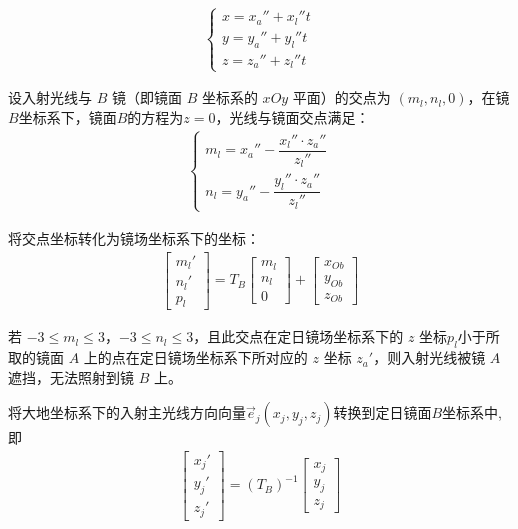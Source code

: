\documentclass[../main.tex]{subfiles}
\begin{document}
\begin{align} \label{1.34}
 \begin{cases}
x = x_a'' + x_l'' t \\
y = y_a'' + y_l'' t \\
z = z_a'' + z_l'' t
\end{cases}
\end{align}
\par 设入射光线与 $B$ 镜（即镜面 $B$ 坐标系的 $xOy$ 平面）的交点为 $(m_l, n_l, 0)$，在镜\( B \)坐标系下，镜面\( B \)的方程为\( z = 0 \)，光线与镜面交点满足：
\begin{align}\label{4.1}
  \begin{cases}
m_l = x_a'' - \dfrac{x_l'' \cdot z_a''}{z_l''} \\
n_l = y_a'' - \dfrac{y_l'' \cdot z_a''}{z_l''}
\end{cases}
\end{align}
\par 将交点坐标转化为镜场坐标系下的坐标：
\begin{align}\label{4.2}
\begin{bmatrix}
m_l' \\
n_l' \\
p_l
\end{bmatrix}
= T_B \begin{bmatrix}
m_l \\
n_l \\
0
\end{bmatrix}
+ \begin{bmatrix}
x_{Ob} \\
y_{Ob} \\
z_{Ob}
\end{bmatrix}
\end{align}
\par 若 $-3 \leq m_l \leq 3$，$-3 \leq n_l \leq 3$，且此交点在定日镜场坐标系下的 $z$ 坐标$p_l$小于所取的镜面 $A$ 上的点在定日镜场坐标系下所对应的 $z$ 坐标 $z_a'$，则入射光线被镜 \( A \) 遮挡，无法照射到镜 \( B \) 上。
\par 将大地坐标系下的入射主光线方向向量$\vec{e}_j (x_j, y_j, z_j)$转换到定日镜面$B$坐标系中,即
\begin{align}    \label{1.99}
\begin{bmatrix}
x_j' \\
y_j' \\
z_j'
\end{bmatrix}
= ({T_B})^{-1} \begin{bmatrix}
x_j \\
y_j \\
z_j
\end{bmatrix}
\end{align}
\end{document}
